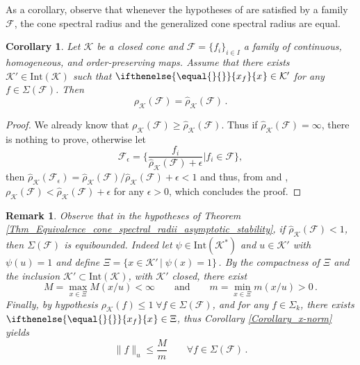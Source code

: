\documentclass{article}
\newtheorem{remark}[theorem]{Remark}
\newtheorem{corollary}[theorem]{Corollary}
\newcommand{\family}{\mathcal{F}}
\newcommand{\cradius}{\rho_{\cone}}
\newcommand{\cgradius}{\widehat{\rho}_{\cone}}
\newcommand{\cone}{\mathcal{K}}
\newcommand{\interior}{\mathrm{Int}}
\newcommand{\ceigenvector}[1][]{
  \ifthenelse{\equal{#1}{}}
  {{x_f}}
  {{x}_{#1}}}
\begin{document}
As a corollary, observe that whenever the hypotheses of 
are satisfied by a family $\family$, the cone spectral radius and the generalized cone spectral radius are equal.


\begin{corollary}\label{Corollary_equality_of_generalized_and_classic_joint_spectral_radii_embedded_subcone}
Let $\cone$ be a closed cone and $\family=\{f_i\}_{i\in I}$ a family of continuous, homogeneous, and order-preserving maps. Assume that there exists $\cone'\in \interior(\cone)$ such that $\ceigenvector\in \cone'$ for any $f\in\Sigma(\family)$. Then 
\begin{equation}
\cradius(\family)=\cgradius(\family)\,.
\end{equation}
\end{corollary}
%
\begin{proof}
We already know that $\cradius(\family)\geq\cgradius(\family)$. Thus if $\cgradius(\family)=\infty$, there is nothing to prove, otherwise let 
\begin{equation}
\family_{\epsilon}=\bigg\{\frac{f_i}{\cgradius(\family)+\epsilon}\bigg| f_i\in\family \bigg\},
\end{equation}
then $\cgradius(\family_{\epsilon})=\cgradius(\family)/\cgradius(\family)+\epsilon<1$ and thus, from  and , $\cradius(\family)<\cgradius(\family)+\epsilon$ for any $\epsilon>0$, which concludes the proof.
\end{proof}
%

\begin{remark}\label{Remark_internal_eigenvectors_corresponds_to_boundedness}
        Observe that in the hypotheses of Theorem \ref{Thm_Equivalence_cone_spectral_radii_asymptotic_stability}, if $\cgradius(\family)<1$, then $\Sigma(\family)$ is equibounded. Indeed let $\psi\in \interior(\cone^*)$ and $u\in\cone'$ with $\psi(u)=1$ and define $\Xi=\{x\in \cone'\,|\; \psi(x)=1\}$\,. By the compactness of $\Xi$ and the inclusion $\cone'\subset\interior(\cone)$, with $\cone'$ closed, there exist
\begin{equation}
M=\max_{x\in \Xi}M(x/u)<\infty \qquad \mathrm{and}\qquad m=\min_{x\in \Xi}m(x/u)>0\,.
\end{equation}
Finally, by hypothesis $\cradius(f)\leq 1\;\forall f\in\Sigma(\family)$, and for any $f\in\Sigma_k$, there exists $\ceigenvector\in\Xi$, thus Corollary \ref{Corollary_x-norm} yields 
\begin{equation}
\|f\|_u\leq \frac{M}{m}\qquad \forall f\in\Sigma(\family)\,.
\end{equation}
%
\end{remark}
\end{document}
